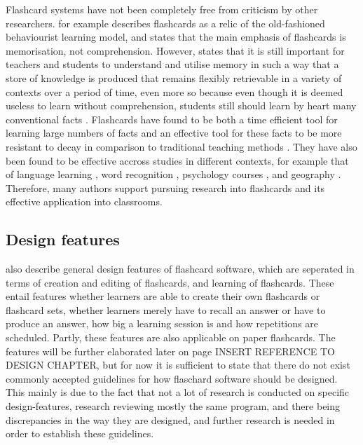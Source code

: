 Flashcard systems have not been completely free from criticism by other researchers.  for example describes flashcards as a relic of the old-fashioned behaviourist learning model, and  states that the main emphasis of flashcards is memorisation, not comprehension. However,  states that it is still important for teachers and students to understand and utilise memory in such a way that a store of knowledge is produced that remains flexibly retrievable in a variety of contexts over a period of time, even more so because even though it is deemed useless to learn without comprehension, students still should learn by heart many conventional facts \cite{glaserfield}. Flashcards have found to be both a time efficient tool for learning large numbers of facts and an effective tool for these facts to be more resistant to decay in comparison to traditional teaching methods \cite{nakata}. They have also been found to be effective accross studies in different contexts, for example that of language learning \cite{chien, macquarrie, mccullough, nakata}, word recognition \cite{joseph}, psychology courses \cite{burgess, golding}, and geography \cite{zirkle}. Therefore, many authors support pursuing research into flashcards and its effective application into classrooms.

\subsection{Design features}

 also describe general design features of flashcard software, which are seperated in terms of creation and editing of flashcards, and learning of flashcards. These entail features whether learners are able to create their own flashcards or flashcard sets, whether learners merely have to recall an answer or have to produce an answer, how big a learning session is and how repetitions are scheduled. Partly, these features are also applicable on paper flashcards. The features will be further elaborated later on page INSERT REFERENCE TO DESIGN CHAPTER, but for now it is sufficient to state that there do not exist commonly accepted guidelines for how flaschard software should be designed. This mainly is due to the fact that not a lot of research is conducted on specific design-features, research reviewing mostly the same program, and there being discrepancies in the way they are designed, and further research is needed in order to establish these guidelines.

